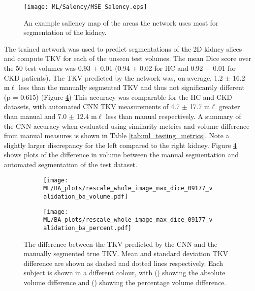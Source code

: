 \begin{figure}[H]
	\centering
	\texttt{[image: ML/Salency/MSE\_Salency.eps]}
	\caption{An example saliency map of the areas the network uses most for segmentation of the kidney.}
	\label{fig:ml_salency}	
\end{figure}

The trained network was used to predict segmentations of the 2D kidney slices and compute \ac{TKV} for each of the unseen test volumes. The mean Dice score over the 50 test volumes was 0.93 $\pm$ 0.01 (0.94 $\pm$ 0.02 for HC and 0.92 $\pm$ 0.01 for \ac{CKD} patients). The \ac{TKV} predicted by the network was, on average, 1.2 $\pm$ 16.2 m$\ell$ less than the manually segmented \ac{TKV} and thus not significantly different (p = 0.615) (Figure \ref{fig:ml_testing_ba}) This accuracy was comparable for the \ac{HC} and \ac{CKD} datasets, with automated CNN \ac{TKV} measurements of 4.7 $\pm$ 17.7 m$\ell$ greater than manual and 7.0 $\pm$ 12.4 m$\ell$ less than manual respectively. A summary of the \ac{CNN} accuracy when evaluated using similarity metrics and volume difference from manual measures is shown in Table \ref{tab:ml_testing_metrics}. Note a slightly larger discrepancy for the left compared to the right kidney. Figure \ref{fig:ml_testing_ba} shows plots of the difference in volume between the manual segmentation and automated segmentation of the test dataset. 

\begin{figure}[H]
	\centering
	\begin{subfigure}[c]{0.47\textwidth}
		\centering
		\texttt{[image: ML/BA\_plots/rescale\_whole\_image\_max\_dice\_09177\_validation\_ba\_volume.pdf]}
		\caption{}
		\label{fig:ml_testing_ba_volume}
	\end{subfigure}
	\hfill
	\begin{subfigure}[c]{0.47\textwidth}
		\centering
		\texttt{[image: ML/BA\_plots/rescale\_whole\_image\_max\_dice\_09177\_validation\_ba\_percent.pdf]}
		\caption{}
		\label{fig:ml_testing_ba_percent}
	\end{subfigure}
	\caption{The difference between the \ac{TKV} predicted by the \ac{CNN} and the manually segmented true \ac{TKV}. Mean and standard deviation \ac{TKV} difference are shown as dashed and dotted lines respectively. Each subject is shown in a different colour, with () showing the absolute volume difference and () showing the percentage volume difference.}
	\label{fig:ml_testing_ba}
\end{figure}

